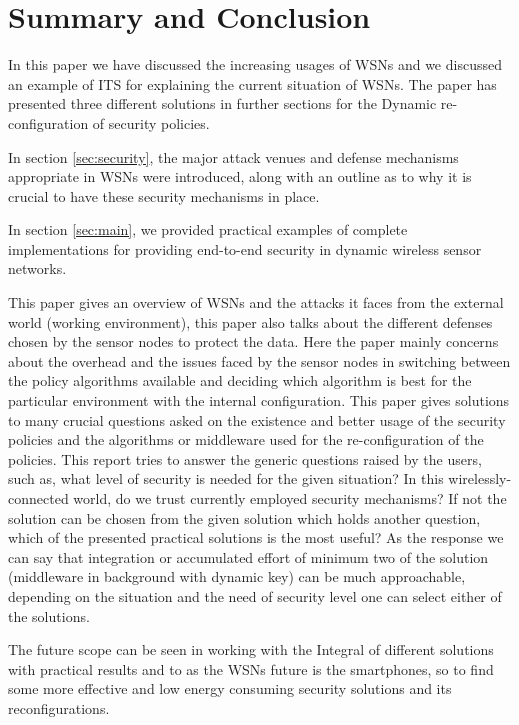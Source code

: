 \documentclass[12pt,a4paper,twoside]{report}
\begin{document}
\section{Summary and Conclusion}
\label{sec:conclusion}
In this paper we have discussed the increasing usages of WSNs and we discussed an example of ITS for explaining the current situation of WSNs. The paper has presented three different solutions in further sections for the Dynamic re-configuration of security policies.\par
In section \ref{sec:security}, the major attack venues and defense mechanisms appropriate in WSNs were introduced, along with an outline as to why it is crucial to have these security mechanisms in place. \par
In section \ref{sec:main}, we provided practical examples of complete implementations for providing end-to-end security in dynamic wireless sensor networks.\par
This paper gives an overview of WSNs and the attacks it faces from the external world (working environment), this paper also talks about the different defenses chosen by the sensor nodes to protect the data. Here the paper mainly concerns about the overhead and the issues faced by the sensor nodes in switching between the policy algorithms available and deciding which algorithm is best for the particular environment with the internal configuration. This paper gives solutions to many crucial questions asked on the existence and better usage of the security policies and the algorithms or middleware used for the re-configuration of the policies. This report tries to answer the generic questions raised by the users, such as, what level of security is needed for the given situation? In this wirelessly-connected world, do we trust currently employed security mechanisms? If not the solution can be chosen from the given solution which holds another question, which of the presented practical solutions is the most useful? As the response we can say that integration or accumulated effort of minimum two of the solution (middleware in background with dynamic key) can be much approachable, depending on the situation and the need of security level one can select either of the solutions.\par
The future scope can be seen in working with the Integral of different solutions with practical results and to as the WSNs future is the smartphones, so to find some more effective and low energy consuming security solutions and its reconfigurations.\par
\end{document}
